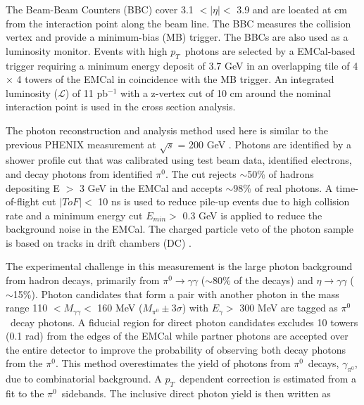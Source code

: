 \documentclass[twocolumn,letterpaper,aps,prl,longbibliography,superscriptaddress,floatfix]{revtex4-2}
\newcommand{\pT}{\ensuremath{p_T}}
\newcommand{\pizero}{\ensuremath{\pi^0}}
\begin{document}


The Beam-Beam Counters (BBC) \cite{ALLEN2003549} cover 3.1 $< |\eta| <$ 3.9 and are located at  cm from the interaction point along the beam line. The BBC measures the collision vertex and provide a minimum-bias (MB) trigger. The BBCs are also used as a luminosity monitor. Events with high \pT\ photons are selected by a EMCal-based trigger requiring a minimum energy deposit of 3.7 GeV in an overlapping tile of 4 $\times$ 4 towers of the EMCal in coincidence with the MB trigger.
An integrated luminosity ($\mathcal{L}$) of 11 pb$^{-1}$ with a z-vertex cut of 10 cm around the nominal interaction point is used in the cross section analysis.
 
The photon reconstruction and analysis method used here is similar to the previous PHENIX measurement at $\sqrt{s}$ =  200 GeV \cite{PhysRevLett.98.012002,PhysRevD.86.072008}. Photons are identified by a shower profile cut that was calibrated using test beam data, identified electrons, and decay photons from identified \pizero. The cut rejects $\sim$50\% of hadrons depositing E $>$ 3 GeV in the EMCal and accepts $\sim$98\% of real photons. A time-of-flight cut $|ToF| <$ 10 ns is used to reduce pile-up events due to high collision rate and a minimum energy cut $E_{min} >$ 0.3 GeV is applied to reduce the background noise in the EMCal. The charged particle veto of the photon sample is based on tracks in drift chambers (DC) \cite{ADCOX2003489}. 


The experimental challenge in this measurement is the large photon background from hadron decays, primarily from $\pi^0 \rightarrow \gamma\gamma$ ($\sim$80\% of the decays) and $\eta \rightarrow \gamma\gamma$ ($\sim$15\%). Photon candidates that form a pair with another photon in the mass range 110 $< M_{\gamma\gamma} <$ 160 MeV ($M_{\pi^0} \pm 3\sigma$) with $E_{\gamma} >$ 300 MeV are tagged as \pizero\ decay photons. A fiducial region for direct photon candidates excludes 10 towers (0.1 rad) from the edges of the EMCal while partner photons are accepted over the entire detector to improve the probability of observing both decay photons from the \pizero. This method overestimates the yield of photons from \pizero\ decays, $\gamma_{\pi^0}$, due to combinatorial background. A \pT\ dependent correction is estimated from a fit to the \pizero\ sidebands. The inclusive direct photon yield is then written as
\end{document}
